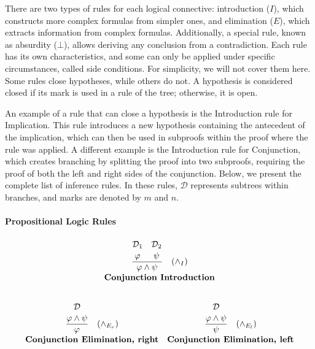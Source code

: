 There are two types of rules for each logical connective: introduction (\(I\)), which constructs more complex formulas from simpler ones, and elimination (\(E\)), which extracts information from complex formulas. Additionally, a special rule, known as absurdity (\(\bot\)), allows deriving any conclusion from a contradiction. Each rule has its own characteristics, and some can only be applied under specific circumstances, called side conditions. For simplicity, we will not cover them here. Some rules close hypotheses, while others do not. A hypothesis is considered closed if its mark is used in a rule of the tree; otherwise, it is open.

An example of a rule that can close a hypothesis is the Introduction rule for Implication. This rule introduces a new hypothesis containing the antecedent of the implication, which can then be used in subproofs within the proof where the rule was applied. A different example is the Introduction rule for Conjunction, which creates branching by splitting the proof into two subproofs, requiring the proof of both the left and right sides of the conjunction. Below, we present the complete list of inference rules. In these rules, \( \mathcal{D} \) represents subtrees within branches, and marks are denoted by \( m \) and \( n \).

\paragraph{Propositional Logic Rules}
\label{sec:pl_rules}
\[
\begin{array}{c c}

\multicolumn{2}{c}{
\frac{\overset{\displaystyle\mathcal{D}_1\strut}{\displaystyle \varphi \strut}\quad \overset{\displaystyle\mathcal{D}_2\strut} {\displaystyle \psi \strut}}{\displaystyle \varphi \land \psi \strut} \quad (\land_I)
} \\[5pt]
\multicolumn{2}{c}{\textbf{Conjunction Introduction}} \\[10pt]
\end{array}
\]

\[
\begin{array}{c c}

\frac{\displaystyle \overset{\displaystyle\mathcal{D} \strut} {\varphi \land \psi \strut}}{\displaystyle \varphi \strut} \quad (\land_{E_r}) 
& \frac{\displaystyle \overset{\displaystyle\mathcal{D} \strut} {\varphi \land \psi \strut}}{\displaystyle \psi \strut} \quad (\land_{E_l}) \\[5pt]
\textbf{Conjunction Elimination, right} & \textbf{Conjunction Elimination, left} \\[10pt]
\end{array}
\]

